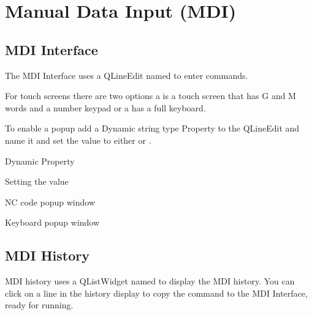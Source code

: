 \documentclass[letterpaper,10pt,english]{sphinxmanual}
\begin{document}
\sphinxstepscope


\chapter{Manual Data Input (MDI)}
\label{\detokenize{mdi:manual-data-input-mdi}}\label{\detokenize{mdi::doc}}
\sphinxAtStartPar
{}


\section{MDI Interface}
\label{\detokenize{mdi:mdi-interface}}
\sphinxAtStartPar
The MDI Interface uses a QLineEdit named  to enter commands.

\sphinxAtStartPar
For touch screens there are two options a  is a touch screen that has
G and M words and a number keypad or a  has a full keyboard.

\sphinxAtStartPar
To enable a popup add a Dynamic string type Property to the 
QLineEdit and name it  and set the value to either  or
.

\sphinxAtStartPar
Dynamic Property


\sphinxAtStartPar
Setting the value


\sphinxAtStartPar
NC code popup window


\sphinxAtStartPar
Keyboard popup window



\section{MDI History}
\label{\detokenize{mdi:mdi-history}}
\sphinxAtStartPar
MDI history uses a QListWidget named  to display the MDI
history. You can click on a line in the history display to copy the command to
the MDI Interface, ready for running.
\end{document}
